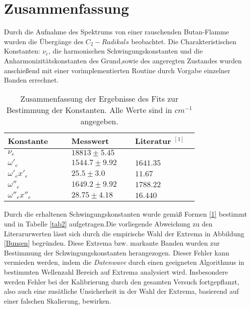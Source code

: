 %

 
%
\section{Zusammenfassung}
Durch die Aufnahme des Spektrums von einer rauschenden Butan-Flamme wurden die Übergänge des $C_2-Radikals$ beobachtet. Die Charakteristischen  Konstanten: $\nu_e$, die harmonischen Schwingungskonstanten und die Anharmonizitätskonstanten des Grund,sowie des angeregten Zustandes wurden anschießend mit einer vorimplementierten Routine durch Vorgabe einzelner Banden errechnet.


\begin{table}[H]

 
 \caption{Zusammenfassung der Ergebnisse des Fits zur Bestimmung der Konstanten. Alle Werte sind in $\si{cm}^{-1}$ angegeben.}
\begin{tabular}{C{0.3\linewidth}|C{0.3\linewidth}C{0.3\linewidth}}

 
 Konstante &  Messwert &  Literatur $^{[1]}$\\
  \hline \addlinespace[1ex] 
$\nu_e$ & $18813 \pm 5.45$ & \\
$\omega'_e$ & $1544.7 \pm9.92$ & $1641.35$ \\
$\omega'_e x'_e$ & $25.5 \pm 3.0$ &  $11.67$ \\
$\omega''_e$ & $1649.2 \pm 9.92$ & $1788.22$ \\
$\omega''_e x''_e$ & $28.75 \pm 4.18$ & $16.440$ \\
 
   
 \end{tabular}
 \label{tab1}
 \end{table}

Durch die erhaltenen Schwingungskonstanten wurde gemäß Formen \ref{1} bestimmt und in Tabelle \ref{tab2} aufgetragen.Die vorliegende Abweichung zu den Literarurwerten lässt sich durch die empirische Wahl der Extrema in Abbildung \ref{Bunsen} begründen. Diese Extrema bzw. markante Banden wurden zur Bestimmung der Schwingungskonstanten herangezogen. Dieser Fehler kann vermieden werden, indem die \textit{Datenwave} durch einen geeigneten Algorithmus in bestimmten Wellenzahl Bereich auf Extrema analysiert wird. Insbesondere werden Fehler bei der Kalibrierung durch den gesamten Versuch fortgepflanzt, also auch eine zusätliche Unsicherheit in der Wahl der Extrema, basierend auf einer falschen Skalierung, bewirken.

%


